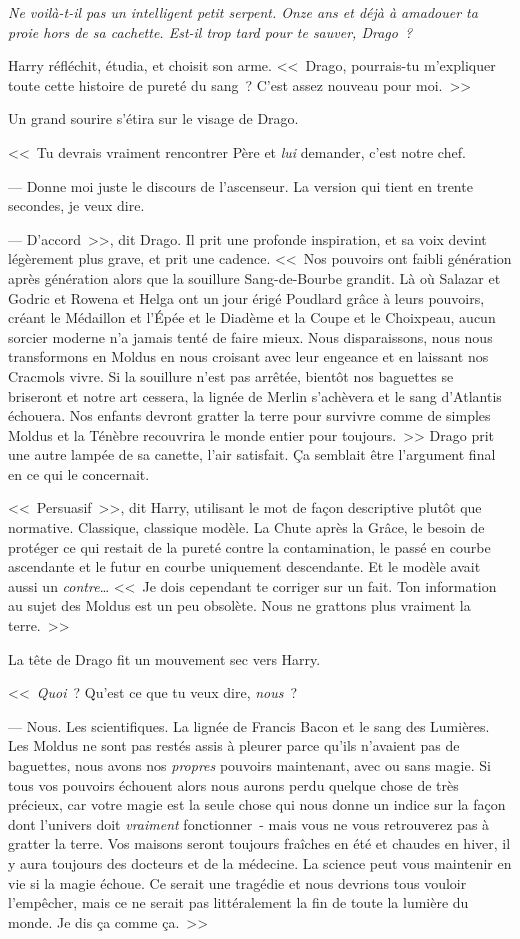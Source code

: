 \emph{Ne voilà-t-il pas un intelligent petit serpent. Onze ans et déjà à amadouer ta proie hors de sa cachette. Est-il trop tard pour te sauver, Drago~?}

Harry réfléchit, étudia, et choisit son arme. <<~Drago, pourrais-tu m'expliquer toute cette histoire de pureté du sang~? C'est assez nouveau pour moi.~>>

Un grand sourire s'étira sur le visage de Drago.

<<~Tu devrais vraiment rencontrer Père et \emph{lui} demander, c'est notre chef.

--- Donne moi juste le discours de l'ascenseur. La version qui tient en trente secondes, je veux dire.

--- D'accord~>>, dit Drago. Il prit une profonde inspiration, et sa voix devint légèrement plus grave, et prit une cadence. <<~Nos pouvoirs ont faibli génération après génération alors que la souillure Sang-de-Bourbe grandit. Là où Salazar et Godric et Rowena et Helga ont un jour érigé Poudlard grâce à leurs pouvoirs, créant le Médaillon et l'Épée et le Diadème et la Coupe et le Choixpeau, aucun sorcier moderne n'a jamais tenté de faire mieux. Nous disparaissons, nous nous transformons en Moldus en nous croisant avec leur engeance et en laissant nos Cracmols vivre. Si la souillure n'est pas arrêtée, bientôt nos baguettes se briseront et notre art cessera, la lignée de Merlin s'achèvera et le sang d'Atlantis échouera. Nos enfants devront gratter la terre pour survivre comme de simples Moldus et la Ténèbre recouvrira le monde entier pour toujours.~>> Drago prit une autre lampée de sa canette, l'air satisfait. Ça semblait être l'argument final en ce qui le concernait.

<<~Persuasif~>>, dit Harry, utilisant le mot de façon descriptive plutôt que normative. Classique, classique modèle. La Chute après la Grâce, le besoin de protéger ce qui restait de la pureté contre la contamination, le passé en courbe ascendante et le futur en courbe uniquement descendante. Et le modèle avait aussi un \emph{contre}… <<~Je dois cependant te corriger sur un fait. Ton information au sujet des Moldus est un peu obsolète. Nous ne grattons plus vraiment la terre.~>>

La tête de Drago fit un mouvement sec vers Harry.

<<~\emph{Quoi}~? Qu'est ce que tu veux dire, \emph{nous}~?

--- Nous. Les scientifiques. La lignée de Francis Bacon et le sang des Lumières. Les Moldus ne sont pas restés assis à pleurer parce qu'ils n'avaient pas de baguettes, nous avons nos \emph{propres} pouvoirs maintenant, avec ou sans magie. Si tous vos pouvoirs échouent alors nous aurons perdu quelque chose de très précieux, car votre magie est la seule chose qui nous donne un indice sur la façon dont l'univers doit \emph{vraiment} fonctionner~- mais vous ne vous retrouverez pas à gratter la terre. Vos maisons seront toujours fraîches en été et chaudes en hiver, il y aura toujours des docteurs et de la médecine. La science peut vous maintenir en vie si la magie échoue. Ce serait une tragédie et nous devrions tous vouloir l'empêcher, mais ce ne serait pas littéralement la fin de toute la lumière du monde. Je dis ça comme ça.~>>

